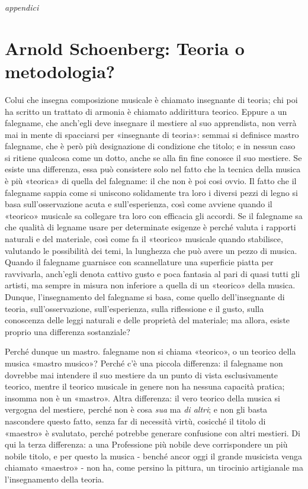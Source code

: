\documentclass{../../lib/gs}
\begin{document}
\thispagestyle{empty}
\null\vfill
{\Huge\emph{appendici}}
\vfill\null

\clearpage

\appendix
\thispagestyle{empty}
\section{Arnold Schoenberg: Teoria o metodologia?}

Colui che insegna composizione musicale è chiamato insegnante di teoria; chi poi ha scritto un trattato di armonia è chiamato addirittura teorico. Eppure a un falegname, che anch'egli deve insegnare il mestiere al suo apprendista, non verrà mai in mente di spacciarsi per «insegnante di teoria»: semmai si definisce mastro falegname, che è però più designazione di condizione che titolo; e in nessun caso si ritiene qualcosa come un dotto, anche se alla fin fine conosce il suo mestiere. Se esiste una differenza, essa può consistere solo nel fatto che la tecnica della musica è più «teorica» di quella del falegname: il che non è poi cosi ovvio. Il fatto che il falegname sappia come si uniscono solidamente tra loro i diversi pezzi di legno si basa sull'osservazione acuta e sull'esperienza, così come avviene quando il «teorico» musicale sa collegare tra loro con efficacia gli accordi. Se il falegname sa che qualità di legname usare per determinate esigenze è perché valuta i rapporti naturali e del materiale, così come fa il «teorico» musicale quando stabilisce, valutando le possibilità dei temi, la lunghezza che può avere un pezzo di musica. Quando il falegname guarnisce con scannellature una superficie piatta per ravvivarla, anch'egli denota cattivo gusto e poca fantasia al pari di quasi tutti gli artisti, ma sempre in misura non inferiore a quella di un «teorico» della musica. Dunque, l'insegnamento del falegname si basa, come quello dell'insegnante di teoria, sull'osservazione, sull'esperienza, sulla riflessione e il gusto, sulla conoscenza delle leggi naturali e delle proprietà del materiale; ma allora, esiste proprio una differenza sostanziale?

Perché dunque un mastro. falegname non si chiama «teorico», o un teorico della musica «mastro musico»? Perché c'è una piccola differenza: il falegname non dovrebbe mai intendere il suo mestiere da un punto di vista esclusivamente teorico, mentre il teorico musicale in genere non ha nessuna capacità pratica; insomma non è un «mastro». Altra differenza: il vero teorico della musica si vergogna del mestiere, perché non è cosa \emph{sua} ma \emph{di altri}; e non gli basta nascondere questo fatto, senza far di necessità virtù, cosicché il titolo di «maestro» è svalutato, perché potrebbe generare confusione con altri mestieri. Di qui la terza differenza: a una Professione più nobile deve corrispondere un più nobile titolo, e per questo la musica - benché ancor oggi il grande musicista venga chiamato «maestro» - non ha, come persino la pittura, un tirocinio artigianale ma l'insegnamento della teoria.
\end{document}
